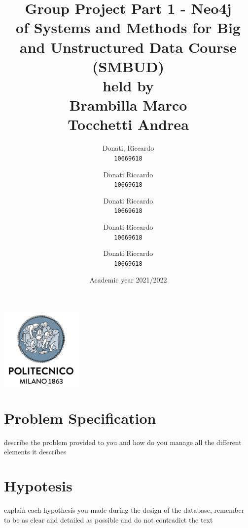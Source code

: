 \documentclass[a4paper,12pt]{article}
\begin{document}
\title{%
  Group Project Part 1 - Neo4j \\
  \large of Systems and Methods for Big
    and Unstructured Data Course \\(SMBUD)\\
    held by\\ Brambilla Marco\\ Tocchetti Andrea}
\author{Donati, Riccardo\\
  \texttt{10669618}
  \and
  Donati Riccardo\\
  \texttt{10669618}
  \and
  Donati Riccardo\\
  \texttt{10669618}
  \and
  Donati Riccardo\\
  \texttt{10669618}
  \and
  Donati Riccardo\\
  \texttt{10669618}}
\date{Academic year 2021/2022}
\maketitle
\begin{center}
  \includegraphics[width=4cm]{polilogo.png}\\
\end{center}
\newpage
\tableofcontents
\newpage

\section{Problem Specification}
\paragraph{}describe the problem provided to you and how do you manage all the different elements it describes
\section{Hypotesis}
\paragraph{}explain each hypothesis you made during the design of the database, remember to be as clear and detailed as possible and do not contradict the text
\end{document}

